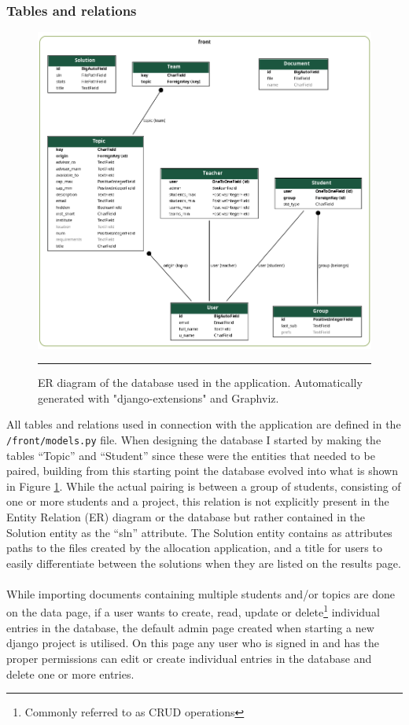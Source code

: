 \subsubsection{Tables and relations}
\begin{figure}[t!]
\centering
\vspace{-2cm}
\includegraphics[width=.8\textwidth]{appendix/erd.png}
\caption{ER diagram of the database used in the application. Automatically generated with "django-extensions" and Graphviz. }
\label{fig:er_dia}
\hrule
\end{figure}
All tables and relations used in  connection with the application are defined in the \verb|/front/models.py| file. When designing the database I started by making the tables ``Topic'' and ``Student'' since these were the entities that needed to be paired, building from this starting point the database evolved into what is shown in Figure \ref{fig:er_dia}. While the actual pairing is between a group of students, consisting of one or more students and a project, this relation is not explicitly present in the Entity Relation (ER) diagram or the database but rather contained in the Solution entity as the ``sln'' attribute. The Solution entity contains as attributes paths to the files created by the allocation application, and a title for users to easily differentiate between the solutions when they are listed on the results page.
\\\\
While importing documents containing multiple students and/or topics are done on the data page, if a user wants to create, read, update or delete\footnote{Commonly referred to as CRUD operations} individual entries in the database, the default admin page created when starting a new django project is utilised. On this page any user who is signed in and has the proper permissions can edit or create individual entries in the database and delete one or more entries.
